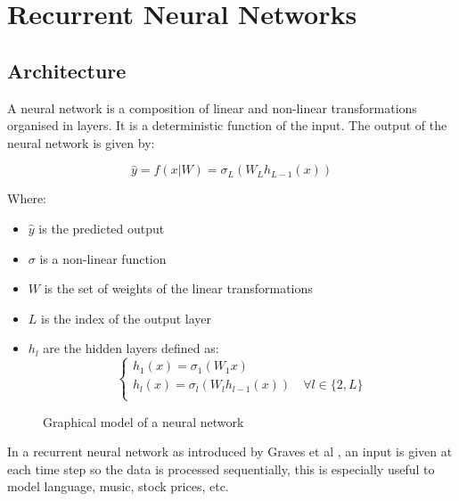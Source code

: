 \documentclass[11pt,oneside,openright]{report}
\begin{document}
\section{Recurrent Neural Networks}

\subsection{Architecture}
A neural network is a composition of linear and non-linear transformations organised in layers. It is a deterministic function of the input. The output of the neural network is given by:

$$ \hat{y} = f(x | W) = \sigma_L (W_L h_{L-1}(x)) $$

Where:
\begin{itemize}
\item $\hat{y}$ is the predicted output
\item $\sigma$ is a non-linear function
\item $W$ is the set of weights of the linear transformations
\item $L$ is the index of the output layer
\item $h_l$ are the hidden layers defined as:
  \begin{equation}
    \begin{cases}
          h_1(x) = \sigma_1(W_1 x)\\
          h_l(x) = \sigma_l (W_l h_{l-1}(x)) \quad \forall l \in \{2, L\}\\
    \end{cases}
  \end{equation}
\end{itemize}

\begin{figure}[H]
\centering
{}
\caption{Graphical model of a neural network}
\end{figure}

In a recurrent neural network as introduced by Graves et al \cite{graves}, an input is given at each time step so the data is processed sequentially, this is especially useful to model language, music, stock prices, etc.
\end{document}
